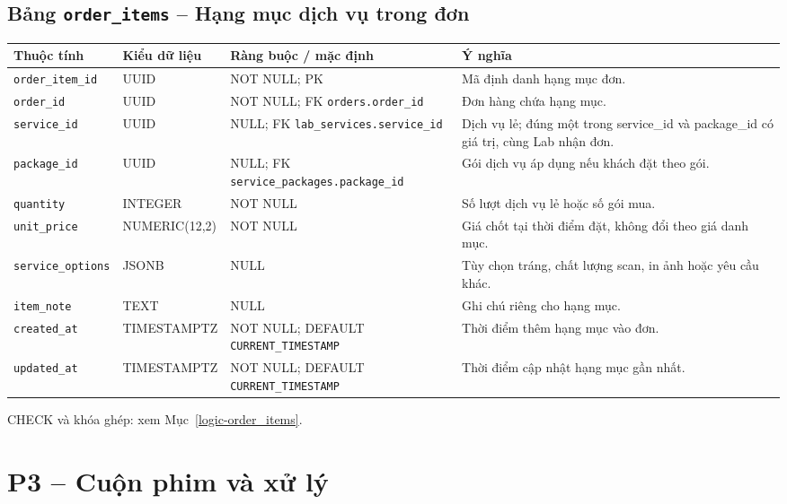 \subsection{Bảng \texttt{order\_\allowbreak{}items} -- Hạng mục dịch vụ trong đơn}
\label{dictionary-order_items}
\begingroup
\footnotesize
\setlength{\tabcolsep}{3pt}
\begin{longtable}{>{\raggedright\arraybackslash}p{3.1cm}>{\raggedright\arraybackslash}p{2.5cm}>{\raggedright\arraybackslash}p{3.7cm}>{\raggedright\arraybackslash}p{4.3cm}}
\toprule
Thuộc tính & Kiểu dữ liệu & Ràng buộc / mặc định & Ý nghĩa \\
\midrule
\endhead
\texttt{order\_\allowbreak{}item\_\allowbreak{}id} & UUID & NOT NULL; PK & Mã định danh hạng mục đơn. \\
\texttt{order\_\allowbreak{}id} & UUID & NOT NULL; FK \texttt{orders.order\_\allowbreak{}id} & Đơn hàng chứa hạng mục. \\
\texttt{service\_\allowbreak{}id} & UUID & NULL; FK \texttt{lab\_\allowbreak{}services.service\_\allowbreak{}id} & Dịch vụ lẻ; đúng một trong service\_id và package\_id có giá trị, cùng Lab nhận đơn. \\
\texttt{package\_\allowbreak{}id} & UUID & NULL; FK \texttt{service\_\allowbreak{}packages.package\_\allowbreak{}id} & Gói dịch vụ áp dụng nếu khách đặt theo gói. \\
\texttt{quantity} & INTEGER & NOT NULL & Số lượt dịch vụ lẻ hoặc số gói mua. \\
\texttt{unit\_\allowbreak{}price} & NUMERIC(12,2) & NOT NULL & Giá chốt tại thời điểm đặt, không đổi theo giá danh mục. \\
\texttt{service\_\allowbreak{}options} & JSONB & NULL & Tùy chọn tráng, chất lượng scan, in ảnh hoặc yêu cầu khác. \\
\texttt{item\_\allowbreak{}note} & TEXT & NULL & Ghi chú riêng cho hạng mục. \\
\texttt{created\_\allowbreak{}at} & TIMESTAMPTZ & NOT NULL; DEFAULT \texttt{CURRENT\_\allowbreak{}TIMESTAMP} & Thời điểm thêm hạng mục vào đơn. \\
\texttt{updated\_\allowbreak{}at} & TIMESTAMPTZ & NOT NULL; DEFAULT \texttt{CURRENT\_\allowbreak{}TIMESTAMP} & Thời điểm cập nhật hạng mục gần nhất. \\
\bottomrule
\end{longtable}
\endgroup
CHECK và khóa ghép: xem Mục~\ref{logic-order_items}.
\section{P3 -- Cuộn phim và xử lý}
